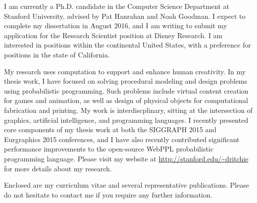 \documentclass[10pt,stdletter,dateno,sigleft]{newlfm} %
\begin{document}
\begin{newlfm}


I am currently a Ph.D. candidate in the Computer Science Department at Stanford University, advised by Pat Hanrahan and Noah Goodman. I expect to complete my dissertation in August 2016, and I am writing to submit my application for the Research Scientist position at Disney Research. I am interested in positions within the continental United States, with a preference for positions in the state of California.

My research uses computation to support and enhance human creativity.
In my thesis work, I have focused on solving procedural modeling and design problems using probabilistic programming.
Such problems include virtual content creation for games and animation, as well as design of physical objects for computational fabrication and printing.
My work is interdiscplinary, sitting at the intersection of graphics, artificial intelligence, and programming languages.
I recently presented core components of my thesis work at both the SIGGRAPH 2015 and Eurgraphics 2015 conferences, and I have also recently contributed significant performance improvements to the open-source WebPPL probabilistic programming language.
Please visit my website at \url{http://stanford.edu/~dritchie} for more details about my research.

Enclosed are my curriculum vitae and several representative publications. Please do not hesitate to contact me if you require any further information.


\end{newlfm}
\end{document}
